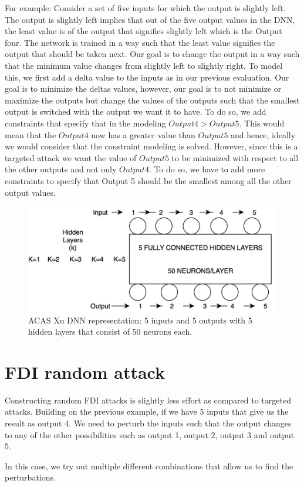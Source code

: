 For example: Consider a set of five inputs for which the output is slightly left. The output is slightly left implies that out of the five output values in the DNN, the least value is of the output that signifies slightly left which is the Output four. The network is trained in a way such that the least value signifies the output that should be taken next. Our goal is to change the output in a way such that the minimum value changes from slightly left to slightly right. To model this, we first add a delta value to the inputs as in our previous evaluation. Our goal is to minimize the deltas values, however, our goal is to not minimize or maximize the outputs but change the values of the outputs such that the smallest output is switched with the output we want it to have. To do so, we add constraints that specify that in the modeling $Output 4 > Output 5$. This would mean that the $Output 4$ now has a greater value than $Output 5$ and hence, ideally we would consider that the constraint modeling is solved. However, since this is a targeted attack we want the value of $Output 5$ to be minimized with respect to all the other outputs and not only $Output 4$. To do so, we have to add more constraints to specify that Output 5 should be the smallest among all the other output values.

\begin{figure}
	\centering
	\includegraphics[width=0.7\linewidth]{Images/ACASXuDNN}
	\caption[ACAS Xu DNN]{ACAS Xu DNN representation: 5 inputs and 5 outputs with 5 hidden layers that consist of 50 neurons each.}
	\label{fig:acasxudnn}
\end{figure}

\section{FDI random attack} 
Constructing random FDI attacks is slightly less effort as compared to targeted attacks.
Building on the previous example, if we have 5 inputs that give us the result as output 4. We need to perturb the inputs such that the output changes to any of the other possibilities such as output 1, output 2, output 3 and output 5.

In this case, we try out multiple different combinations that allow us to find the perturbations. 
